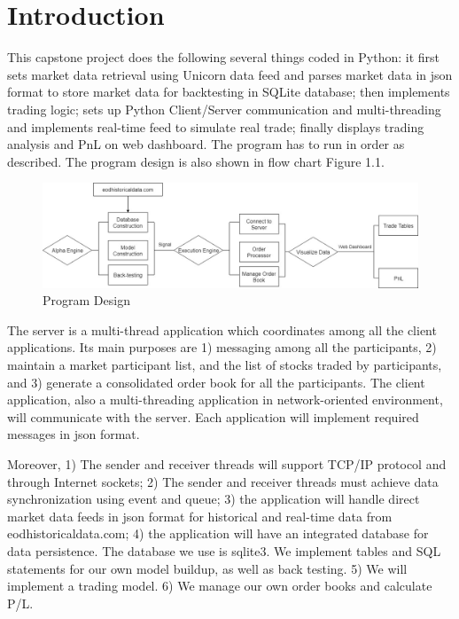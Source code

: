 \chapter{Introduction}
\label{chap:introduction}

%
This capstone project does the following several things coded in Python:
it first sets market data retrieval using Unicorn data feed and parses market data in json format to store market data for backtesting in SQLite database; then implements trading logic; sets up Python Client/Server communication and multi-threading and implements real-time feed to simulate real trade; finally displays trading analysis and PnL on web dashboard. The program has to run in order as described. The program design is also shown in flow chart Figure 1.1.

\begin{figure}
\centering
\includegraphics[scale=0.35]{introduction/images/flowchart.jpg}
\caption{Program Design}
\label{fig:flow}
\end{figure}

%
The server is a multi-thread application which coordinates among all the client applications. Its main purposes are 1) messaging among all the participants, 2) maintain a market participant list, and the list of stocks traded by participants, and 3) generate a consolidated order book for all the participants. The client application, also a multi-threading application in network-oriented environment, will communicate with the server. Each application will implement required messages in json format. 

%
Moreover, 1) The sender and receiver threads will support TCP/IP protocol and through Internet sockets;
2) The sender and receiver threads must achieve data synchronization using event and queue;
3) the application will handle direct market data feeds in json format for historical and real-time data from eodhistoricaldata.com;
4) the application will have an integrated database for data persistence. The database we use is sqlite3. We implement tables and SQL statements for our own model buildup, as well as back testing.
5) We will implement a trading model.
6) We manage our own order books and calculate P/L.

